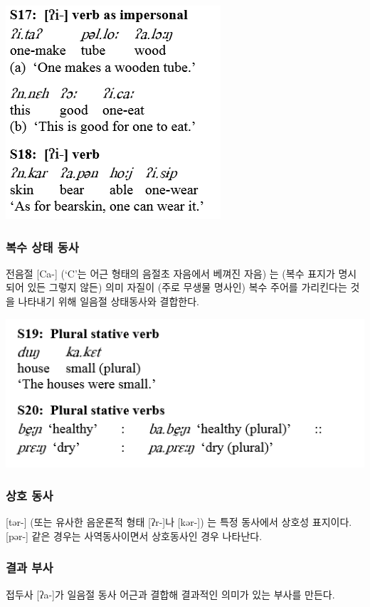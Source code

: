 \includegraphics{Pacoh/src/PacohS17.png}

\subsubsection{복수 상태 동사}

전음절 [Ca-] (`C'는 어근 형태의 음절초 자음에서 베껴진 자음) 는 (복수 표지가 명시되어 있든 그렇지 않든) 의미 자질이 (주로 무생물 명사인) 복수 주어를 가리킨다는 것을 나타내기 위해 
일음절 상태동사와 결합한다.

\includegraphics{Pacoh/src/PacohS19.png}

\subsubsection{상호 동사}
[tər-] (또는 유사한 음운론적 형태 [ʔr-]나 [kər-]) 는 특정 동사에서 상호성 표지이다. [pər-] 같은 경우는 사역동사이면서 상호동사인 경우 나타난다.

\subsubsection{결과 부사}
접두사 [ʔa-]가 일음절 동사 어근과 결합해 결과적인 의미가 있는 부사를 만든다.

